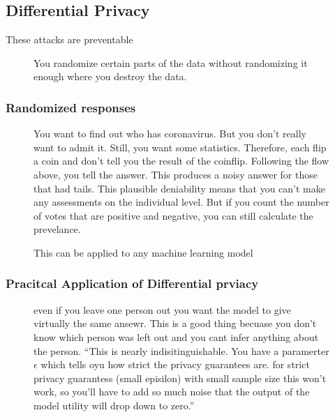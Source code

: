 \documentclass[11pt]{article}
\begin{document}
\subsection{Differential Privacy}

These attacks are preventable

\begin{figure}[H]
    \centering
    \caption{You randomize certain parts of the data without randomizing it enough where you destroy the data.}
\end{figure}

\subsubsection{Randomized responses}

\begin{figure}[H]
    \centering
    \caption{You want to find out who has coronavirus. But you don't really want to admit it. Still, you want some statistics. Therefore, each flip a coin and don't tell you the result of the coinflip. Following the flow above, you tell the answer. This produces a noisy answer for those that had tails. This plausible deniability means that you can't make any assessments on the individual level. But if you count the number of votes that are positive and negative, you can still calculate the prevelance.}
\end{figure}

\begin{figure}[H]
    \centering
    \caption{This can be applied to any machine learning model}
\end{figure}

\subsubsection{Pracitcal Application of Differential prviacy}

\begin{figure}[H]
    \centering
    \caption{even if you leave one person out you want the model to give virtually the same ansewr. This is a good thing becuase you don't know which person was left out and you cant infer anything about the person. ``This is nearly indisitinguishable. You have a paramerter $\epsilon$ which tells oyu how strict the privacy guarantees are. for strict privacy guarantess (small episilon) with small sample size this won't work, so you'll have to add so much noise that the output of the model utility will drop down to zero.''}
\end{figure}
\end{document}
